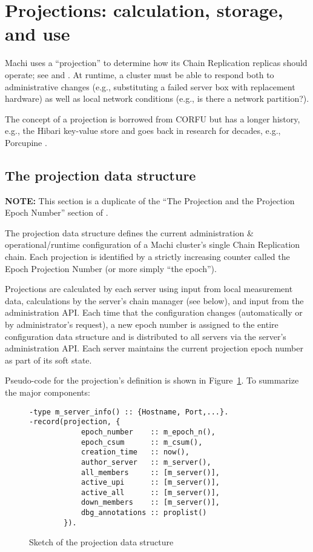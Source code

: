\documentclass[preprint,10pt]{sigplanconf}
\begin{document}
\section{Projections: calculation, storage, and use}
\label{sec:projections}

Machi uses a ``projection'' to determine how its Chain Replication replicas
should operate; see \cite{machi-design} and
\cite{corfu1}.  At runtime, a cluster must be able to respond both to
administrative changes (e.g., substituting a failed server box with
replacement hardware) as well as local network conditions (e.g., is
there a network partition?).

The concept of a projection is borrowed
from CORFU but has a longer history, e.g., the Hibari key-value store
\cite{cr-theory-and-practice} and goes back in research for decades,
e.g., Porcupine \cite{porcupine}.

\subsection{The projection data structure}
\label{sub:the-projection}

{\bf NOTE:} This section is a duplicate of the ``The Projection and
the Projection Epoch Number'' section of \cite{machi-design}.

The projection data
structure defines the current administration \& operational/runtime
configuration of a Machi cluster's single Chain Replication chain.
Each projection is identified by a strictly increasing counter called
the Epoch Projection Number (or more simply ``the epoch'').

Projections are calculated by each server using input from local
measurement data, calculations by the server's chain manager
(see below), and input from the administration API.
Each time that the configuration changes (automatically or by
administrator's request), a new epoch number is assigned
to the entire configuration data structure and is distributed to
all servers via the server's administration API.  Each server maintains the
current projection epoch number as part of its soft state.

Pseudo-code for the projection's definition is shown in
Figure~\ref{fig:projection}.  To summarize the major components:

\begin{figure}
\begin{verbatim}
-type m_server_info() :: {Hostname, Port,...}.
-record(projection, {
            epoch_number    :: m_epoch_n(),
            epoch_csum      :: m_csum(),
            creation_time   :: now(),
            author_server   :: m_server(),
            all_members     :: [m_server()],
            active_upi      :: [m_server()],
            active_all      :: [m_server()],
            down_members    :: [m_server()],
            dbg_annotations :: proplist()
        }).
\end{verbatim}
\caption{Sketch of the projection data structure}
\label{fig:projection}
\end{figure}
\end{document}

